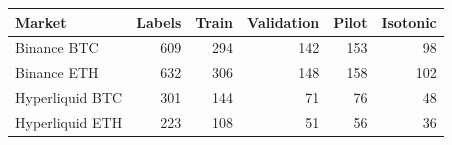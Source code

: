 \begin{tabular}{lrrrrr}
\toprule
Market & Labels & Train & Validation & Pilot & Isotonic \\
\midrule
Binance BTC & 609 & 294 & 142 & 153 & 98 \\
Binance ETH & 632 & 306 & 148 & 158 & 102 \\
Hyperliquid BTC & 301 & 144 & 71 & 76 & 48 \\
Hyperliquid ETH & 223 & 108 & 51 & 56 & 36 \\
\bottomrule
\end{tabular}
